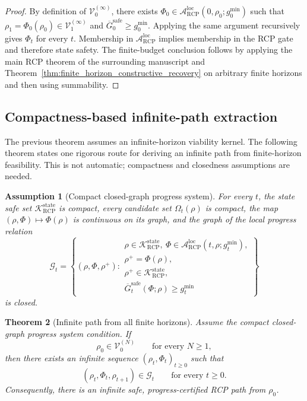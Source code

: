 \documentclass[11pt]{article}
\newtheorem{theorem}{Theorem}[section]
\newtheorem{assumption}[theorem]{Assumption}
\newcommand{\K}{\mathcal{K}}
\newcommand{\Acal}{\mathcal{A}}
\newcommand{\Gcal}{\mathcal{G}}
\newcommand{\1}{\mathbf{1}}
\newcommand{\RCP}{\mathrm{RCP}}
\newcommand{\state}{\mathrm{state}}
\newcommand{\safe}{\mathrm{safe}}
\providecommand{\Vcal}{\mathcal{V}}
\begin{document}
\begin{proof}
By definition of \(\Vcal_0^{(\infty)}\), there exists \(\Phi_0\in\Acal_{\RCP}^{\mathrm{loc}}(0,\rho_0;g_0^{\min})\) such that \(\rho_1=\Phi_0(\rho_0)\in\Vcal_1^{(\infty)}\) and \(\overline G_0^{\safe}\ge g_0^{\min}\).  Applying the same argument recursively gives \(\Phi_t\) for every \(t\).  Membership in \(\Acal_{\RCP}^{\mathrm{loc}}\) implies membership in the RCP gate and therefore state safety.  The finite-budget conclusion follows by applying the main RCP theorem of the surrounding manuscript and Theorem~\ref{thm:finite_horizon_constructive_recovery} on arbitrary finite horizons and then using summability.
\end{proof}

\subsection{Compactness-based infinite-path extraction}

The previous theorem assumes an infinite-horizon viability kernel.  The following theorem states one rigorous route for deriving an infinite path from finite-horizon feasibility.  This is not automatic; compactness and closedness assumptions are needed.

\begin{assumption}[Compact closed-graph progress system]
\label{ass:compact_closed_graph_progress}
For every \(t\), the state safe set \(\K_{\RCP}^{\state}\) is compact, every candidate set \(\Omega_t(\rho)\) is compact, the map \((\rho,\Phi)\mapsto\Phi(\rho)\) is continuous on its graph, and the graph of the local progress relation
\[
\Gcal_t
=
\left\{(\rho,\Phi,\rho^+):
\begin{array}{l}
\rho\in\K_{\RCP}^{\state},\
\Phi\in\Acal_{\RCP}^{\mathrm{loc}}(t,\rho;g_t^{\min}),\\
\rho^+=\Phi(\rho),\\
\rho^+\in\K_{\RCP}^{\state},\\
\overline G_t^{\safe}(\Phi;\rho)\ge g_t^{\min}
\end{array}
\right\}
\]
is closed.
\end{assumption}

\begin{theorem}[Infinite path from all finite horizons]
\label{thm:infinite_path_from_finite_horizons}
Assume the compact closed-graph progress system condition.  If
\[
\rho_0\in\Vcal_0^{(N)}
\qquad
\text{for every }N\ge1,
\]
then there exists an infinite sequence \((\rho_t,\Phi_t)_{t\ge0}\) such that
\[
(\rho_t,\Phi_t,\rho_{t+1})\in\Gcal_t
\qquad
\text{for every }t\ge0.
\]
Consequently, there is an infinite safe, progress-certified RCP path from \(\rho_0\).
\end{theorem}
\end{document}
